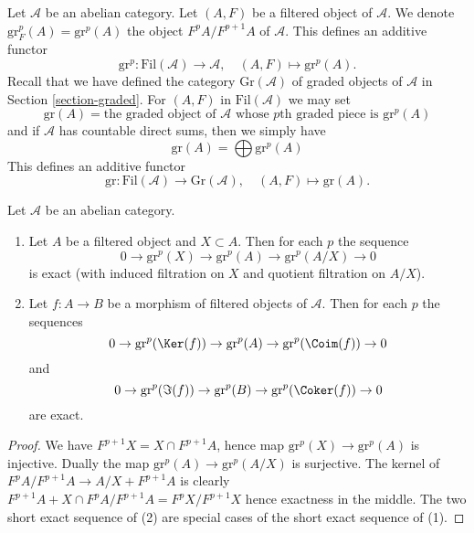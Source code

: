 \noindent
Let $\mathcal{A}$ be an abelian category. Let $(A, F)$ be a filtered
object of $\mathcal{A}$. We denote $\text{gr}^p_F(A) = \text{gr}^p(A)$
the object $F^pA/F^{p + 1}A$ of $\mathcal{A}$. This defines an
additive functor
$$
\text{gr}^p :
\text{Fil}(\mathcal{A})
\longrightarrow
\mathcal{A}, \quad
(A, F)
\longmapsto
\text{gr}^p(A).
$$
Recall that we have defined the category $\text{Gr}(\mathcal{A})$
of graded objects of $\mathcal{A}$ in Section \ref{section-graded}.
For $(A, F)$ in $\text{Fil}(\mathcal{A})$ we may set
$$
\text{gr}(A) = \text{the graded object of }\mathcal{A}\text{ whose }
p\text{th graded piece is }\text{gr}^p(A)
$$
and if $\mathcal{A}$ has countable direct sums, then we simply have
$$
\text{gr}(A) = \bigoplus \text{gr}^p(A)
$$
This defines an additive functor
$$
\text{gr} :
\text{Fil}(\mathcal{A})
\longrightarrow
\text{Gr}(\mathcal{A}), \quad
(A, F) \longmapsto \text{gr}(A).
$$

\begin{lemma}
\label{lemma-ses-gr}
Let $\mathcal{A}$ be an abelian category.
\begin{enumerate}
\item Let $A$ be a filtered object and $X \subset A$. Then for each $p$
the sequence
$$
0 \to \text{gr}^p(X) \to \text{gr}^p(A) \to \text{gr}^p(A/X) \to 0
$$
is exact (with induced filtration on $X$ and quotient filtration on $A/X$).
\item Let $f : A \to B$ be a morphism of filtered objects of $\mathcal{A}$.
Then for each $p$ the sequences
$$
0 \to \text{gr}^p(\Ker(f)) \to \text{gr}^p(A) \to
\text{gr}^p(\Coim(f)) \to 0
$$
and
$$
0 \to \text{gr}^p(\Im(f)) \to \text{gr}^p(B) \to
\text{gr}^p(\Coker(f)) \to 0
$$
are exact.
\end{enumerate}
\end{lemma}

\begin{proof}
We have $F^{p + 1}X = X \cap F^{p + 1}A$, hence map
$\text{gr}^p(X) \to \text{gr}^p(A)$ is injective. Dually the map
$\text{gr}^p(A) \to \text{gr}^p(A/X)$ is surjective.
The kernel of $F^pA/F^{p + 1}A \to A/X + F^{p + 1}A$
is clearly $F^{p + 1}A + X \cap F^pA/F^{p + 1}A = F^pX/F^{p + 1}X$
hence exactness in the middle.
The two short exact sequence of (2) are special cases of the
short exact sequence of (1).
\end{proof}


